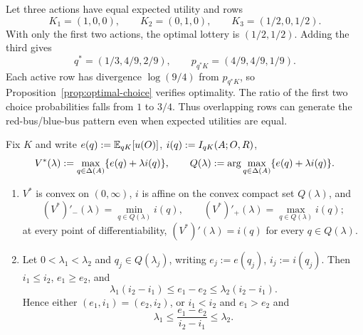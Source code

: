 \begin{remark}\label{rem:overlap-iia-example}
Let three actions have equal expected utility and rows
\[
 K_1=(1,0,0),\qquad K_2=(0,1,0),\qquad K_3=(1/2,0,1/2).
\]
With only the first two actions, the optimal lottery is $(1/2,1/2)$.  Adding the third gives
\[
 q^*=(1/3,4/9,2/9),\qquad p_{q^*K}=(4/9,4/9,1/9).
\]
Each active row has divergence $\log(9/4)$ from $p_{q^*K}$, so
Proposition~\ref{prop:optimal-choice} verifies optimality.  The ratio of the first two choice probabilities falls
from $1$ to $3/4$.  Thus overlapping rows can generate the red-bus/blue-bus pattern even when expected utilities
are equal.
\end{remark}

\begin{proposition}\label{prop:trace-demand}
Fix $K$ and write $e(q):=\mathbb E_{qK}[u(O)]$, $i(q):=I_{qK}(A;O,R)$,
\[
 V^*(\lambda):=\max_{q\in\Delta(A)}\{e(q)+\lambda i(q)\},
 \qquad
 Q(\lambda):=\arg\max_{q\in\Delta(A)}\{e(q)+\lambda i(q)\}.
\]
\begin{enumerate}[label=\textup{(\roman*)},leftmargin=*]
\item $V^*$ is convex on $(0,\infty)$, $i$ is affine on the convex compact set $Q(\lambda)$, and
\[
 (V^*)'_-(\lambda)=\min_{q\in Q(\lambda)}i(q),
 \qquad
 (V^*)'_+(\lambda)=\max_{q\in Q(\lambda)}i(q);
\]
at every point of differentiability, $(V^*)'(\lambda)=i(q)$ for every $q\in Q(\lambda)$.
\item Let $0<\lambda_1<\lambda_2$ and $q_j\in Q(\lambda_j)$, writing $e_j:=e(q_j)$, $i_j:=i(q_j)$.  Then
$i_1\le i_2$, $e_1\ge e_2$, and
\[
 \lambda_1(i_2-i_1)\le e_1-e_2\le\lambda_2(i_2-i_1).
\]
Hence either $(e_1,i_1)=(e_2,i_2)$, or $i_1<i_2$ and $e_1>e_2$ and
\[
 \lambda_1\le\frac{e_1-e_2}{i_2-i_1}\le\lambda_2.
\]
\end{enumerate}
\end{proposition}

